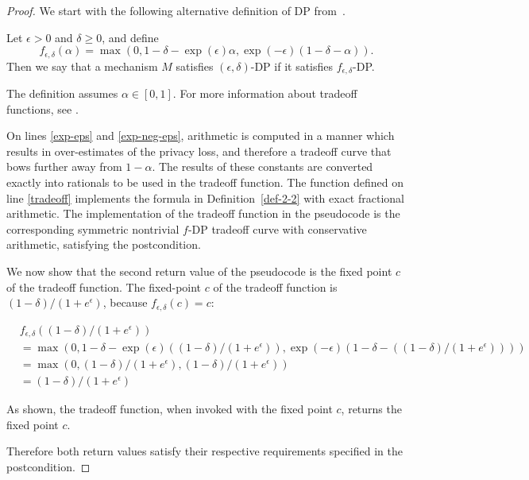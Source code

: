 \documentclass{article}
\begin{document}
\begin{proof} 
    We start with the following alternative definition of DP from~\cite{dong2019gaussian}.
\begin{definition}
    \label{def-2-2}
    Let $\epsilon > 0$ and $\delta \geq 0$, and define 
    \begin{equation}
        f_{\epsilon,\delta}(\alpha) = \max(0, 1 - \delta - \exp(\epsilon) \alpha, \exp(-\epsilon) (1 - \delta - \alpha)).
    \end{equation}
    Then we say that a mechanism $M$ satisfies $(\epsilon, \delta)$-DP if it satisfies $f_{\epsilon,\delta}$-DP.
\end{definition}
The definition assumes $\alpha \in [0, 1]$.
For more information about tradeoff functions, see \cite{dong2019gaussian}.

On lines \ref{exp-eps} and \ref{exp-neg-eps}, 
arithmetic is computed in a manner which results in over-estimates of the privacy loss, 
and therefore a tradeoff curve that bows further away from $1 - \alpha$.
The results of these constants are converted exactly into rationals to be used in the tradeoff function.
The function defined on line \ref{tradeoff} implements the formula in Definition~\ref{def-2-2} with exact fractional arithmetic.
The implementation of the tradeoff function in the pseudocode is the corresponding symmetric nontrivial $f$-DP tradeoff curve with conservative arithmetic,
satisfying the postcondition.

We now show that the second return value of the pseudocode is the fixed point $c$ of the tradeoff function.
The fixed-point $c$ of the tradeoff function is $(1 - \delta) / (1 + e^\epsilon)$, because $f_{\epsilon,\delta}(c) = c$:

\begin{align}
    &f_{\epsilon,\delta}((1 - \delta) / (1 + e^\epsilon)) \\
    &= \max(0, 1 - \delta - \exp(\epsilon) ((1 - \delta) / (1 + e^\epsilon)), \exp(-\epsilon) (1 - \delta - ((1 - \delta) / (1 + e^\epsilon)))) \\
    &= \max(0, (1 - \delta) / (1 + e^\epsilon), (1 - \delta) / (1 + e^\epsilon)) \\
    &= (1 - \delta) / (1 + e^\epsilon)
\end{align}

As shown, the tradeoff function, when invoked with the fixed point $c$, returns the fixed point $c$.

Therefore both return values satisfy their respective requirements specified in the postcondition.
\end{proof}

\printbibliography
\end{document}
